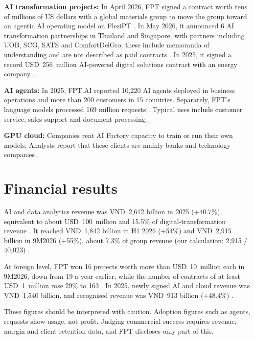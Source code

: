 \documentclass[a4paper,12pt]{report}
\begin{document}
\textbf{AI transformation projects:} In April 2026, FPT signed a contract worth tens of millions of US dollars with a global materials group to move the group toward an agentic AI operating model on FleziPT \cite{A22}. In May 2026, it announced 6 AI transformation partnerships in Thailand and Singapore, with partners including UOB, SCG, SATS and ComfortDelGro; these include memoranda of understanding and are not described as paid contracts \cite{S25}. In 2025, it signed a record USD~256~million AI-powered digital solutions contract with an energy company \cite{A27}.

\textbf{AI agents:} In 2025, FPT.AI reported 10,220 AI agents deployed in business operations and more than 200 customers in 15 countries. Separately, FPT's language models processed 169 million requests \cite{A26}. Typical uses include customer service, sales support and document processing.

\textbf{GPU cloud:} Companies rent AI Factory capacity to train or run their own models. Analysts report that these clients are mainly banks and technology companies \cite{M6}.

\section{Financial results}

AI and data analytics revenue was VND~2,612 billion in 2025 (+40.7\%), equivalent to about USD~100~million and 15.5\% of digital-transformation revenue \cite{M1,M6}. It reached VND~1,842 billion in H1 2026 (+54\%) and VND~2,915 billion in 9M2026 (+55\%), about 7.3\% of group revenue (our calculation: 2,915 / 40,023) \cite{M14,S2}.

At foreign level, FPT won 16 projects worth more than USD~10~million each in 9M2026, down from 19 a year earlier, while the number of contracts of at least USD~1~million rose 29\% to 163 \cite{M15}. In 2025, newly signed AI and cloud revenue was VND~1,540 billion, and recognised revenue was VND~913 billion (+48.4\%) \cite{S16}.

These figures should be interpreted with caution. Adoption figures such as agents, requests show usage, not profit. Judging commercial success requires revenue, margin and client retention data, and FPT discloses only part of this.




\end{document}
